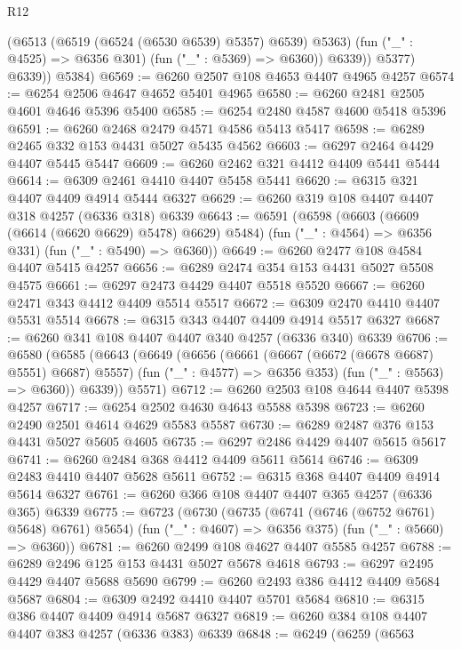 \begin{lexlean}{R12}
\begin{coremodule}
                  (@6513 (@6519 (@6524 (@6530 @6539) @5357) @6539) @5363)
                  (fun ("_" : @4525) => @6356 @301)
                  (fun ("_" : @5369) => @6360))
                @6339))
            @5377)
          @6339))
      @5384)
@6569 := @6260 @2507 @108 @4653 @4407 @4965 @4257
@6574 := @6254 @2506 @4647 @4652 @5401 @4965
@6580 := @6260 @2481 @2505 @4601 @4646 @5396 @5400
@6585 := @6254 @2480 @4587 @4600 @5418 @5396
@6591 := @6260 @2468 @2479 @4571 @4586 @5413 @5417
@6598 := @6289 @2465 @332 @153 @4431 @5027 @5435 @4562
@6603 := @6297 @2464 @4429 @4407 @5445 @5447
@6609 := @6260 @2462 @321 @4412 @4409 @5441 @5444
@6614 := @6309 @2461 @4410 @4407 @5458 @5441
@6620 := @6315 @321 @4407 @4409 @4914 @5444 @6327
@6629 := @6260 @319 @108 @4407 @4407 @318 @4257 (@6336 @318) @6339
@6643 := @6591
    (@6598
      (@6603 (@6609 (@6614 (@6620 @6629) @5478) @6629) @5484)
      (fun ("_" : @4564) => @6356 @331)
      (fun ("_" : @5490) => @6360))
@6649 := @6260 @2477 @108 @4584 @4407 @5415 @4257
@6656 := @6289 @2474 @354 @153 @4431 @5027 @5508 @4575
@6661 := @6297 @2473 @4429 @4407 @5518 @5520
@6667 := @6260 @2471 @343 @4412 @4409 @5514 @5517
@6672 := @6309 @2470 @4410 @4407 @5531 @5514
@6678 := @6315 @343 @4407 @4409 @4914 @5517 @6327
@6687 := @6260 @341 @108 @4407 @4407 @340 @4257 (@6336 @340) @6339
@6706 := @6580
    (@6585
      (@6643
        (@6649
          (@6656
            (@6661 (@6667 (@6672 (@6678 @6687) @5551) @6687) @5557)
            (fun ("_" : @4577) => @6356 @353)
            (fun ("_" : @5563) => @6360))
          @6339))
      @5571)
@6712 := @6260 @2503 @108 @4644 @4407 @5398 @4257
@6717 := @6254 @2502 @4630 @4643 @5588 @5398
@6723 := @6260 @2490 @2501 @4614 @4629 @5583 @5587
@6730 := @6289 @2487 @376 @153 @4431 @5027 @5605 @4605
@6735 := @6297 @2486 @4429 @4407 @5615 @5617
@6741 := @6260 @2484 @368 @4412 @4409 @5611 @5614
@6746 := @6309 @2483 @4410 @4407 @5628 @5611
@6752 := @6315 @368 @4407 @4409 @4914 @5614 @6327
@6761 := @6260 @366 @108 @4407 @4407 @365 @4257 (@6336 @365) @6339
@6775 := @6723
    (@6730
      (@6735 (@6741 (@6746 (@6752 @6761) @5648) @6761) @5654)
      (fun ("_" : @4607) => @6356 @375)
      (fun ("_" : @5660) => @6360))
@6781 := @6260 @2499 @108 @4627 @4407 @5585 @4257
@6788 := @6289 @2496 @125 @153 @4431 @5027 @5678 @4618
@6793 := @6297 @2495 @4429 @4407 @5688 @5690
@6799 := @6260 @2493 @386 @4412 @4409 @5684 @5687
@6804 := @6309 @2492 @4410 @4407 @5701 @5684
@6810 := @6315 @386 @4407 @4409 @4914 @5687 @6327
@6819 := @6260 @384 @108 @4407 @4407 @383 @4257 (@6336 @383) @6339
@6848 := @6249
    (@6259
      (@6563

\end{coremodule}
\end{lexlean}
